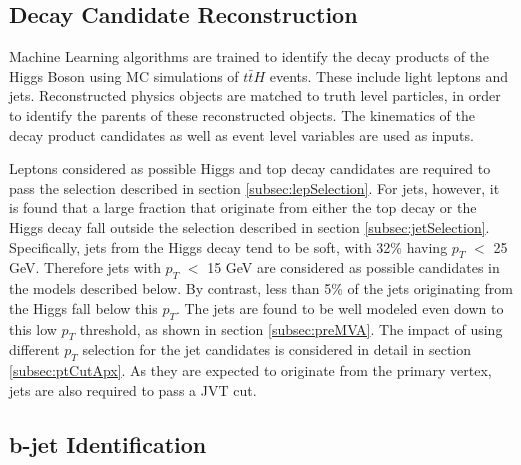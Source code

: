 \subsection{Decay Candidate Reconstruction}
\label{sec:truthLevelReco}

Machine Learning algorithms are trained to identify the decay products of the Higgs Boson using MC simulations of $t\bar{t}H$ events. These include light leptons and jets. Reconstructed physics objects are matched to truth level particles, in order to identify the parents of these reconstructed objects. The kinematics of the decay product candidates as well as event level variables are used as inputs. 


Leptons considered as possible Higgs and top decay candidates are required to pass the selection described in section \ref{subsec:lepSelection}. For jets, however, it is found that a large fraction that originate from either the top decay or the Higgs decay fall outside the selection described in section \ref{subsec:jetSelection}. Specifically, jets from the Higgs decay tend to be soft, with 32\% having $p_T$ $<$ 25 GeV. Therefore jets with $p_T$ $<$ 15 GeV are considered as possible candidates in the models described below. By contrast, less than 5\% of the jets originating from the Higgs fall below this $p_T$. The jets are found to be well modeled even down to this low $p_T$ threshold, as shown in section \ref{subsec:preMVA}. The impact of using different $p_T$ selection for the jet candidates is considered in detail in section \ref{subsec:ptCutApx}. As they are expected to originate from the primary vertex, jets are also required to pass a JVT cut.

\subsection{b-jet Identification}
\label{sec:bjetID}

